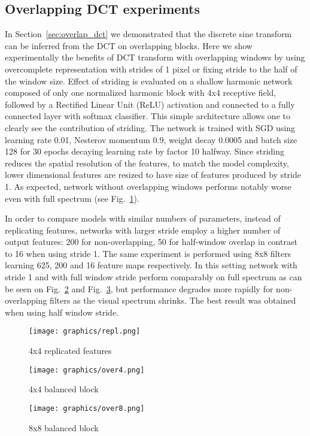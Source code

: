 \documentclass[conference]{IEEEtran}
\begin{document}
\subsection{Overlapping DCT experiments} \label{sec:exp/overlap}

In Section~\ref{sec:overlap_dct} we  demonstrated that the discrete sine transform can be inferred from the DCT on overlapping blocks. Here we show experimentally the benefits of DCT transform with overlapping windows by using overcomplete representation with strides of 1 pixel or fixing stride to the half of the window size.
Effect of striding is evaluated on a shallow harmonic network composed of only one normalized harmonic block with 4x4 receptive field, followed by a Rectified Linear Unit (ReLU) activation and connected to a fully connected layer with softmax classifier. This simple architecture allows one to clearly see the contribution of striding. The network is trained with SGD using learning rate 0.01, Nesterov momentum 0.9, weight decay 0.0005 and batch size 128 for 30 epochs decaying learning rate by factor 10 halfway.
Since striding reduces the spatial resolution of the features, to match the model complexity, lower dimensional features are resized to have size of features produced by stride 1. As expected, network without overlapping windows performs notably worse even with full spectrum (see Fig.~\ref{fig:stride_repl}). 

In order to compare models with similar numbers of parameters, instead of replicating features, networks with larger stride employ a higher number of output features: 200 for non-overlapping, 50 for half-window overlap in contrast to 16 when using stride 1. The same experiment is performed using 8x8 filters learning 625, 200 and 16 feature maps respectively. In this setting network with stride 1 and with full window stride perform comparably on full spectrum as can be seen on Fig.~\ref{fig:stride_bal4} and Fig.~\ref{fig:stride_bal8}, but performance degrades more rapidly for non-overlapping filters as the visual spectrum shrinks. The best result was obtained when using half window stride.

\begin{figure*}
 \centering
 \begin{subfigure}[b]{0.323\linewidth}
  \texttt{[image: graphics/repl.png]}
  \caption{4x4 replicated features} \label{fig:stride_repl}
 \end{subfigure}
 \begin{subfigure}[b]{0.323\linewidth}
  \texttt{[image: graphics/over4.png]}
  \caption{4x4 balanced block} \label{fig:stride_bal4}
 \end{subfigure}
  \begin{subfigure}[b]{0.323\linewidth}
  \texttt{[image: graphics/over8.png]}
  \caption{8x8 balanced block} \label{fig:stride_bal8}
 \end{subfigure}
   \caption{Accuracy degradation of models with different strides when truncating number of DCT coefficients. Stride 1 (green), half window stride (blue) and full window stride (red) are compared. Reported values are averaged over 5 runs.} \label{fig:stride}
\end{figure*}
\end{document}
